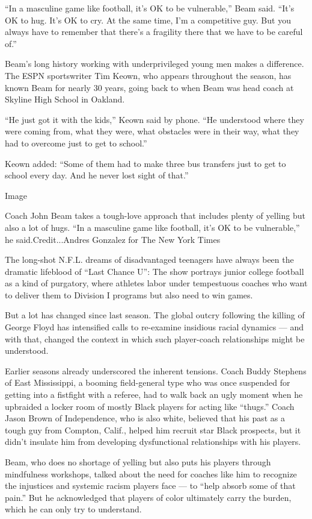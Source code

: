 ``In a masculine game like football, it's OK to be vulnerable,'' Beam
said. ``It's OK to hug. It's OK to cry. At the same time, I'm a
competitive guy. But you always have to remember that there's a
fragility there that we have to be careful of.''

Beam's long history working with underprivileged young men makes a
difference. The ESPN sportswriter Tim Keown, who appears throughout the
season, has known Beam for nearly 30 years, going back to when Beam was
head coach at Skyline High School in Oakland.

``He just got it with the kids,'' Keown said by phone. ``He understood
where they were coming from, what they were, what obstacles were in
their way, what they had to overcome just to get to school.''

Keown added: ``Some of them had to make three bus transfers just to get
to school every day. And he never lost sight of that.''

Image

Coach John Beam takes a tough-love approach that includes plenty of
yelling but also a lot of hugs. ``In a masculine game like football,
it's OK to be vulnerable,'' he said.Credit...Andres Gonzalez for The New
York Times

The long-shot N.F.L. dreams of disadvantaged teenagers have always been
the dramatic lifeblood of ``Last Chance U'': The show portrays junior
college football as a kind of purgatory, where athletes labor under
tempestuous coaches who want to deliver them to Division I programs but
also need to win games.

But a lot has changed since last season. The global outcry following the
killing of George Floyd has intensified calls to re-examine insidious
racial dynamics --- and with that, changed the context in which such
player-coach relationships might be understood.

Earlier seasons already underscored the inherent tensions. Coach Buddy
Stephens of East Mississippi, a booming field-general type who was once
suspended for getting into a fistfight with a referee, had to walk back
an ugly moment when he upbraided a locker room of mostly Black players
for acting like ``thugs.'' Coach Jason Brown of Independence, who is
also white, believed that his past as a tough guy from Compton, Calif.,
helped him recruit star Black prospects, but it didn't insulate him from
developing dysfunctional relationships with his players.

Beam, who does no shortage of yelling but also puts his players through
mindfulness workshops, talked about the need for coaches like him to
recognize the injustices and systemic racism players face --- to ``help
absorb some of that pain.'' But he acknowledged that players of color
ultimately carry the burden, which he can only try to understand.

